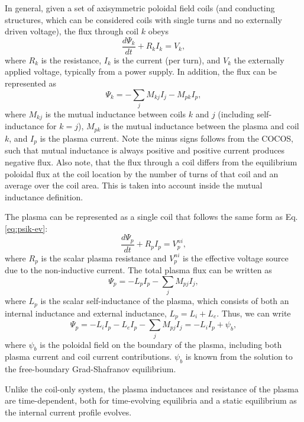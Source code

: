 \documentclass[reprint,onecolumn,amsmath,aip,pop,letterpaper, 11pt]{revtex4-1}
\begin{document}
In general,  given a set of axisymmetric poloidal field coils (and conducting structures,  which can be considered coils with single turns and no externally driven voltage),  the flux through coil $k$ obeys
\begin{equation}
\frac{d\Psi_k}{dt} + R_kI_k = V_k, \label{eq:psik-ev}
\end{equation}
where $R_k$ is the resistance, $I_k$ is the current (per turn),  and $V_k$ the externally applied voltage, typically from a power supply.  In addition, the flux can be represented as
\begin{equation}
\Psi_k = -\sum_j M_{kj} I_j - M_{pk} I_p, \label{eq:psik}
\end{equation}
where $M_{kj}$ is the mutual inductance between coils $k$ and $j$ (including self-inductance for $k=j$), $M_{pk}$ is the mutual inductance between the plasma and coil $k$, and $I_p$ is the plasma current. Note the minus signs follows from the COCOS, such that mutual inductance is always positive and positive current produces negative flux. Also note, that the flux through a coil differs from the equilibrium poloidal flux at the coil location by the number of turns of that coil and an average over the coil area. This is taken into account inside the mutual inductance definition.

The plasma can be represented as a single coil that follows the same form as Eq.  \ref{eq:psik-ev}:
\begin{equation}
\frac{d\Psi_p}{dt} + R_pI_p = V_p^{ni}, \label{eq:psip-ev}
\end{equation}
where $R_p$ is the scalar plasma resistance and $V_p^{ni}$ is the effective voltage source due to the non-inductive current. The total plasma flux can be written as
\begin{equation}
\Psi_p = -L_pI_p - \sum_j M_{pj} I_j, \label{eq:psip1}
\end{equation}
where $L_p$ is the scalar self-inductance of the plasma,  which consists of both an internal inductance and external inductance, $L_p = L_i + L_e$.  Thus, we can write
\begin{equation}
\Psi_p = -L_iI_p - L_eI_p - \sum_j M_{pj} I_j = -L_i I_p + \psi_b, \label{eq:psip2}
\end{equation}
where $\psi_b$ is the poloidal field on the boundary of the plasma, including both plasma current and coil current contributions.  $\psi_b$ is known from the solution to the free-boundary Grad-Shafranov equilibrium.

Unlike the coil-only system, the plasma inductances and resistance of the plasma are time-dependent, both for time-evolving equilibria and a static equilibrium as the internal current profile evolves.
\end{document}
